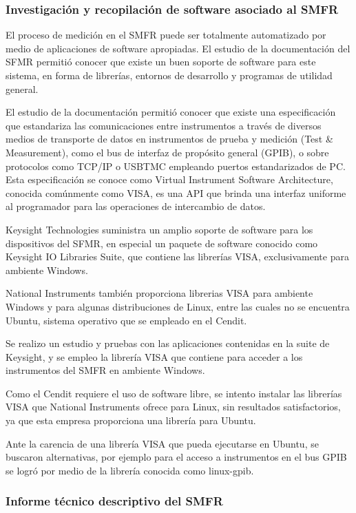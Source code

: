 \documentclass[paper=letter,oneside,fontsize=11pt, parskip=full]{scrartcl}
\begin{document}
	\subsubsection{Investigación y recopilación de software asociado al SMFR}
	
	El proceso de medición en el SMFR puede ser totalmente automatizado por medio de aplicaciones de software apropiadas. El estudio de la documentación del SFMR permitió conocer que existe un buen soporte de software para este sistema, en forma de librerías, entornos de desarrollo y programas de utilidad general.
	
	El estudio de la documentación permitió conocer que existe una especificación que estandariza las comunicaciones entre instrumentos a través de diversos medios de transporte de datos en instrumentos de prueba y medición (Test \& Measurement), como  el bus de interfaz de propósito general (GPIB), o sobre protocolos como TCP/IP o USBTMC empleando puertos estandarizados de PC. Esta especificación se conoce como Virtual Instrument Software Architecture, conocida comúnmente como VISA, es una API que brinda una interfaz uniforme al programador para las operaciones de intercambio de datos. 
	
	Keysight Technologies suministra un amplio soporte de software para los dispositivos del SFMR, en especial un paquete de software conocido como Keysight IO Libraries Suite, que contiene las librerías VISA, exclusivamente para ambiente Windows. 
	
	National Instruments también proporciona librerias VISA para ambiente Windows y para algunas distribuciones de Linux, entre las cuales no se encuentra Ubuntu, 
	sistema operativo que se empleado en el Cendit.
	
	Se realizo un estudio y pruebas con las aplicaciones contenidas en la suite de Keysight, y se empleo la librería VISA que contiene para acceder a los instrumentos del SMFR en ambiente Windows.
	
	Como el Cendit requiere el uso de software libre, se intento instalar las librerías VISA que National Instruments ofrece para Linux, sin resultados satisfactorios, ya que esta empresa proporciona una librería para Ubuntu.	
	
	Ante la carencia de una librería VISA que pueda ejecutarse en Ubuntu, se buscaron alternativas, por ejemplo para el acceso a instrumentos en el bus GPIB se logró por medio de la librería conocida como linux-gpib.
	
	\subsubsection{Informe técnico descriptivo del SMFR}	
	
\end{document}

